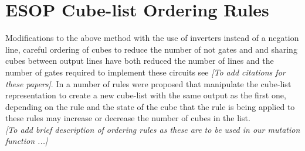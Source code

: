 \section{ESOP Cube-list Ordering Rules}


Modifications to the above method with the use of inverters instead of a negation line, careful ordering 
of cubes to reduce the number of not gates and and sharing cubes between output lines have both reduced 
the number of lines and the number of gates required to implement these circuits see \emph{[To add citations for these papers]}.  
In \cite{Nayeem2011} a number of rules were proposed that manipulate the cube-list representation to create a new cube-list with 
the same output as the first one, 
depending on the rule and the state of the cube that the rule is being applied to these rules may increase 
or decrease the number of cubes in the list.\\


\noindent \emph{[To add brief description of ordering rules as these are to be used in our mutation function ...]}